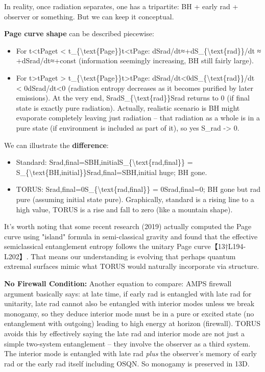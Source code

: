 \documentclass[]{article}
\begin{document}
In reality, once radiation separates, one has a tripartite: BH + early
rad + observer or something. But we can keep it conceptual.

\textbf{Page curve shape} can be described piecewise:

\begin{itemize}
\item
  For t\textless{}tPaget \textless{}
  t\_\{\textbackslash{}text\{Page\}\}t\textless{}tPage​:
  dSrad/dt≈+dS\_\{\textbackslash{}text\{rad\}\}/dt ≈ +dSrad​/dt≈+const
  (information seemingly increasing, BH still fairly large).
\item
  For t\textgreater{}tPaget \textgreater{}
  t\_\{\textbackslash{}text\{Page\}\}t\textgreater{}tPage​:
  dSrad/dt\textless{}0dS\_\{\textbackslash{}text\{rad\}\}/dt \textless{}
  0dSrad​/dt\textless{}0 (radiation entropy decreases as it becomes
  purified by later emissions). At the very end,
  SradS\_\{\textbackslash{}text\{rad\}\}Srad​ returns to 0 (if final
  state is exactly pure radiation). Actually, realistic scenario is BH
  might evaporate completely leaving just radiation -- that radiation as
  a whole is in a pure state (if environment is included as part of it),
  so yes S\_rad -\textgreater{} 0.
\end{itemize}

We can illustrate the \textbf{difference}:

\begin{itemize}
\item
  Standard:
  Srad,final=SBH,initialS\_\{\textbackslash{}text\{rad,final\}\} =
  S\_\{\textbackslash{}text\{BH,initial\}\}Srad,final​=SBH,initial​
  huge; BH gone.
\item
  TORUS: Srad,final=0S\_\{\textbackslash{}text\{rad,final\}\} =
  0Srad,final​=0; BH gone but rad pure (assuming initial state pure).
  Graphically, standard is a rising line to a high value, TORUS is a
  rise and fall to zero (like a mountain shape).
\end{itemize}

It's worth noting that some recent research (2019) actually computed the
Page curve using "island" formula in semi-classical gravity and found
that the effective semiclassical entanglement entropy follows the
unitary Page curve【13†L194-L202】. That means our understanding is
evolving that perhaps quantum extremal surfaces mimic what TORUS would
naturally incorporate via structure.

\textbf{No Firewall Condition:} Another equation to compare: AMPS
firewall argument basically says: at late time, if early rad is
entangled with late rad for unitarity, late rad cannot also be entangled
with interior modes unless we break monogamy, so they deduce interior
mode must be in a pure or excited state (no entanglement with outgoing)
leading to high energy at horizon (firewall). TORUS avoids this by
effectively saying the late rad and interior mode are not just a simple
two-system entanglement -- they involve the observer as a third system.
The interior mode is entangled with late rad \emph{plus} the observer's
memory of early rad or the early rad itself including OSQN. So monogamy
is preserved in 13D.
\end{document}
